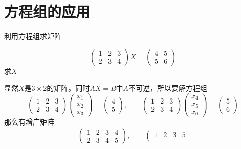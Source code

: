 \section{方程组的应用}
利用方程组求矩阵
\begin{example}
    \[
        \begin{pmatrix}
            1 & 2 & 3 \\
            2 & 3 & 4
        \end{pmatrix}
        X
        =
        \begin{pmatrix}
            4 & 5 \\
            5 & 6
        \end{pmatrix}
    \]
    求$X$
\end{example}
\begin{solution}
    显然$X$是$3\times 2$的矩阵。同时$AX=B$中$A$不可逆，所以要解方程组
    \[
        \begin{pmatrix}
            1 & 2 & 3 \\
            2 & 3 & 4
        \end{pmatrix}
        \begin{pmatrix}
            x_1 \\ x_2 \\ x_3
        \end{pmatrix}
        =
        \begin{pmatrix}
            4 \\5
        \end{pmatrix},\qquad
        \begin{pmatrix}
            1 & 2 & 3 \\
            2 & 3 & 4
        \end{pmatrix}
        \begin{pmatrix}
            x_4 \\ x_5 \\ x_6
        \end{pmatrix}
        =
        \begin{pmatrix}
            5 \\6
        \end{pmatrix}
    \]
    那么有增广矩阵
    \[
        \left(\begin{array}{ccc|c}
                1 & 2 & 3 & 4 \\
                2 & 3 & 4 & 5
            \end{array}\right)
        ,\qquad
        \left(\begin{array}{ccc|c}
                1 & 2 & 3 & 5 \\

\end{array}\]
\end{solution}
